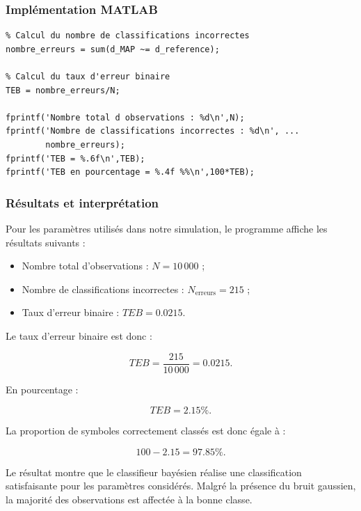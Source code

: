 \subsubsection{Implémentation MATLAB}

\begin{verbatim}
% Calcul du nombre de classifications incorrectes
nombre_erreurs = sum(d_MAP ~= d_reference);

% Calcul du taux d'erreur binaire
TEB = nombre_erreurs/N;

fprintf('Nombre total d observations : %d\n',N);
fprintf('Nombre de classifications incorrectes : %d\n', ...
        nombre_erreurs);
fprintf('TEB = %.6f\n',TEB);
fprintf('TEB en pourcentage = %.4f %%\n',100*TEB);
\end{verbatim}

\subsubsection{Résultats et interprétation}

Pour les paramètres utilisés dans notre simulation,
le programme affiche les résultats suivants :

\begin{itemize}
    \item Nombre total d'observations : $N=10\,000$ ;
    \item Nombre de classifications incorrectes :
    $N_{\mathrm{erreurs}}=215$ ;
    \item Taux d'erreur binaire : $TEB=0.0215$.
\end{itemize}

Le taux d'erreur binaire est donc :

\begin{equation}
TEB=\frac{215}{10\,000}=0.0215.
\end{equation}

En pourcentage :

\begin{equation}
\boxed{TEB=2.15\%.}
\end{equation}

La proportion de symboles correctement classés est
donc égale à :

\begin{equation}
100-2.15=97.85\%.
\end{equation}

Le résultat montre que le classifieur bayésien réalise
une classification satisfaisante pour les paramètres
considérés. Malgré la présence du bruit gaussien,
la majorité des observations est affectée à la bonne
classe.

